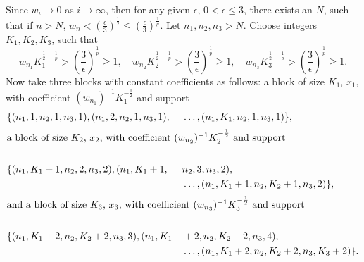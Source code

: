 \documentclass[12pt]{amsart}
\theoremstyle{definition}
\theoremstyle{remark}
\numberwithin{equation}{section}
\begin{document}
Since $w_i \rightarrow 0$ as $i \rightarrow \infty$,
 then for any given $\epsilon $, $0<\epsilon \leq 3$,
 there exists an $N$, such that if $n > N$, 
$w_n<\left(\frac{\epsilon}{3}\right)^{\frac{1}{2}}\leq
\left(\frac{\epsilon}{3}\right)^{\frac{1}{p}}$.
Let $n_1, n_2, n_3 > N$.
Choose integers $K_1, K_2, K_3$, such that
$$w_{n_1}K_{1}^{\frac{1}{2}-\frac{1}{p}}
> \left(\frac{3}{\epsilon}\right)^{\frac{1}{p}}\ge 1, \quad
w_{n_2}K_{2}^{\frac{1}{2}-\frac{1}{p}}
> \left(\frac{3}{\epsilon}\right)^{\frac{1}{p}}\ge 1,\quad
w_{n_3}K_{3}^{\frac{1}{2}-\frac{1}{p}}
> \left(\frac{3}{\epsilon}\right)^{\frac{1}{p}}\ge 1.$$ 
Now take three blocks with constant coefficients as follows:\newline
a block of size $K_1$, $x_1$, with coefficient
$(w_{n_1})^{-1}K_{1}^{-\frac{1}{2}}$ and support
\begin{alignat*}{2}
&\{(n_1,1, n_2,1, n_3,1),
(n_1,2, n_2,1,n_3,1),
&&\dots,
(n_1, K_1, n_2,1, n_3,1)\},\\
\intertext{a block of size $ K_2$, $x_2$, with coefficient
$(w_{n_2})^{-1} K_{2}^{-\frac{1}{2}}$ and support}\\
&\{(n_1,K_1+1, n_2,2, n_3,2),
(n_1,K_1+1,&&n_2,3, n_3,2),\\
&&&\dots,
(n_1, K_1+1, n_2,K_2+1, n_3,2)\},\\
\intertext{and a block of size $K_3$, $x_3$, with coefficient
$(w_{n_3})^{-1} K_{3}^{-\frac{1}{2}}$ and support}\\
&\{(n_1, K_1+2, n_2,K_2+2, n_3,3),
(n_1,K_1&&+2,n_2,K_2+2, n_3,4),\\
&&&\dots,
(n_1, K_1+2, n_2,K_2+2, n_3,K_3+2)\}.
\end{alignat*}
\end{document}
